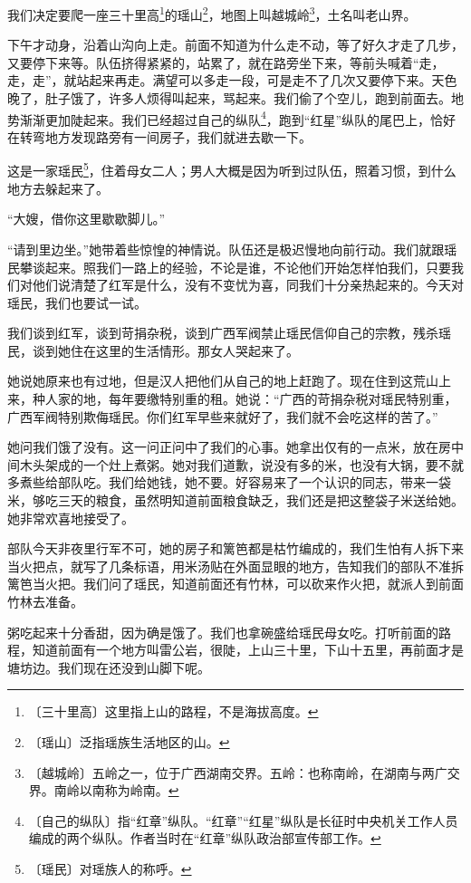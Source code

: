 \documentclass[12pt,UTF-8,openany]{ctexbook}
\begin{document}
\begin{normalsize}
    
    我们决定要爬一座三十里高\footnote{〔三十里高〕这里指上山的路程，不是海拔高度。}的瑶山\footnote{〔瑶山〕泛指瑶族生活地区的山。}，地图上叫越城岭\footnote{〔越城岭〕五岭之一，位于广西湖南交界。五岭：也称南岭，在湖南与两广交界。南岭以南称为岭南。}，土名叫老山界。
    
    下午才动身，沿着山沟向上走。前面不知道为什么走不动，等了好久才走了几步，又要停下来等。队伍挤得紧紧的，站累了，就在路旁坐下来，等前头喊着“走，走，走”，就站起来再走。满望可以多走一段，可是走不了几次又要停下来。天色晚了，肚子饿了，许多人烦得叫起来，骂起来。我们偷了个空儿，跑到前面去。地势渐渐更加陡起来。我们已经超过自己的纵队\footnote{〔自己的纵队〕指“红章”纵队。“红章”“红星”纵队是长征时中央机关工作人员编成的两个纵队。作者当时在“红章”纵队政治部宣传部工作。}，跑到“红星”纵队的尾巴上，恰好在转弯地方发现路旁有一间房子，我们就进去歇一下。
    
    这是一家瑶民\footnote{〔瑶民〕对瑶族人的称呼。}，住着母女二人；男人大概是因为听到过队伍，照着习惯，到什么地方去躲起来了。
    
    “大嫂，借你这里歇歇脚儿。”
    
    “请到里边坐。”她带着些惊惶的神情说。队伍还是极迟慢地向前行动。我们就跟瑶民攀谈起来。照我们一路上的经验，不论是谁，不论他们开始怎样怕我们，只要我们对他们说清楚了红军是什么，没有不变忧为喜，同我们十分亲热起来的。今天对瑶民，我们也要试一试。
    
    我们谈到红军，谈到苛捐杂税，谈到广西军阀禁止瑶民信仰自己的宗教，残杀瑶民，谈到她住在这里的生活情形。那女人哭起来了。
    
    她说她原来也有过地，但是汉人把他们从自己的地上赶跑了。现在住到这荒山上来，种人家的地，每年要缴特别重的租。她说：“广西的苛捐杂税对瑶民特别重，广西军阀特别欺侮瑶民。你们红军早些来就好了，我们就不会吃这样的苦了。”
    
    她问我们饿了没有。这一问正问中了我们的心事。她拿出仅有的一点米，放在房中间木头架成的一个灶上煮粥。她对我们道歉，说没有多的米，也没有大锅，要不就多煮些给部队吃。我们给她钱，她不要。好容易来了一个认识的同志，带来一袋米，够吃三天的粮食，虽然明知道前面粮食缺乏，我们还是把这整袋子米送给她。她非常欢喜地接受了。
    
    部队今天非夜里行军不可，她的房子和篱笆都是枯竹编成的，我们生怕有人拆下来当火把点，就写了几条标语，用米汤贴在外面显眼的地方，告知我们的部队不准拆篱笆当火把。我们问了瑶民，知道前面还有竹林，可以砍来作火把，就派人到前面竹林去准备。
    
    粥吃起来十分香甜，因为确是饿了。我们也拿碗盛给瑶民母女吃。打听前面的路程，知道前面有一个地方叫雷公岩，很陡，上山三十里，下山十五里，再前面才是塘坊边。我们现在还没到山脚下呢。
    

\end{normalsize}
\end{document}
